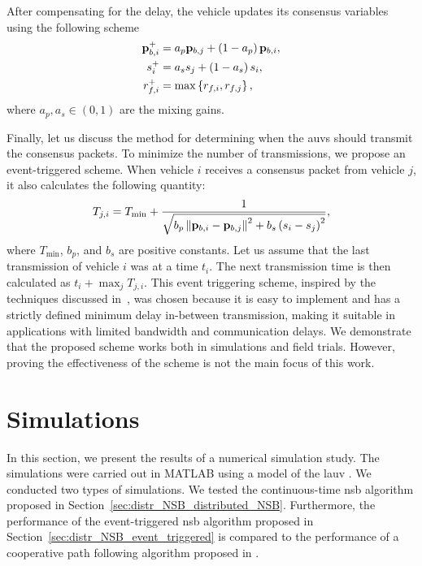 After compensating for the delay, the vehicle updates its consensus variables using the following scheme
\begin{align}
    \mathbf{p}_{b, i}^{+} &= a_p \mathbf{p}_{b, j} + \left(1 - a_p\right) \mathbf{p}_{b, i}, \\
    s_i^{+} &= a_s s_j + \left(1 - a_s\right) s_i, \\
    r_{f, i}^{+} &= \max\left\{r_{f, i}, r_{f, j}\right\},
\end{align}
where $a_p, a_s \in (0, 1)$ are the mixing gains.

Finally, let us discuss the method for determining when the \glspl{auv} should transmit the consensus packets.
To minimize the number of transmissions, we propose an event-triggered scheme.
When vehicle $i$ receives a consensus packet from vehicle $j$, it also calculates the following quantity:
\begin{equation}
    T_{j,i} = T_{\min} + \frac{1}{\sqrt{b_p\left\|\mathbf{p}_{b, i} - \mathbf{p}_{b, j}\right\|^2 + b_s\left(s_i - s_j\right)^2}},
\end{equation}
where $T_{\min}$, $b_p$, and $b_s$ are positive constants.
Let us assume that the last transmission of vehicle $i$ was at a time $t_i$.
The next transmission time is then calculated as $t_i + \max_j T_{j, i}$.
This event triggering scheme, inspired by the techniques discussed in~\cite{ding2017overview}, was chosen because it is easy to implement and has a strictly defined minimum delay in-between transmission, making it suitable in applications with limited bandwidth and communication delays. We demonstrate that the proposed scheme works both in simulations and field trials. However, proving the effectiveness of the scheme is not the main focus of this work.%

\section{Simulations}
\label{sec:distr_NSB_simulations}

In this section, we present the results of a numerical simulation study.
The simulations were carried out in MATLAB using a model of the \acrfull{lauv} \cite{sousa_LAUV_2012}.
We conducted two types of simulations. 
We tested the continuous-time \gls{nsb} algorithm proposed in Section~\ref{sec:distr_NSB_distributed_NSB}.
Furthermore, the performance of the event-triggered \gls{nsb} algorithm proposed in Section~\ref{sec:distr_NSB_event_triggered} is compared to the performance of a cooperative path following algorithm proposed in \cite{praveen_cooperative_2018}.

